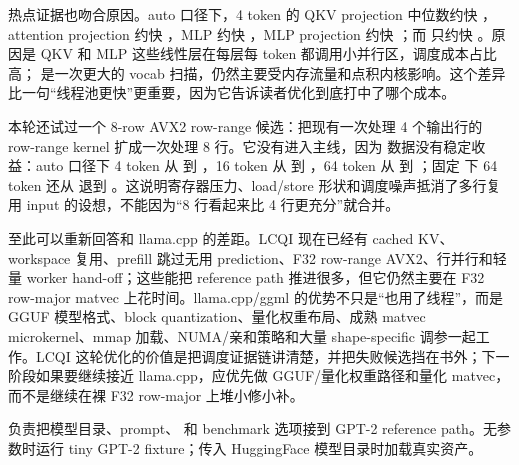热点证据也吻合原因。auto 口径下，4 token 的 QKV projection 中位数约快 ，attention projection 约快 ，MLP  约快 ，MLP projection 约快 ；而  只约快 。原因是 QKV 和 MLP 这些线性层在每层每 token 都调用小并行区，调度成本占比高； 是一次更大的 vocab 扫描，仍然主要受内存流量和点积内核影响。这个差异比一句“线程池更快”更重要，因为它告诉读者优化到底打中了哪个成本。

本轮还试过一个 8-row AVX2 row-range 候选：把现有一次处理 4 个输出行的 row-range kernel 扩成一次处理 8 行。它没有进入主线，因为  数据没有稳定收益：auto 口径下 4 token 从  到 ，16 token 从  到 ，64 token 从  到 ；固定  下 64 token 还从  退到 。这说明寄存器压力、load/store 形状和调度噪声抵消了多行复用 input 的设想，不能因为“8 行看起来比 4 行更充分”就合并。

至此可以重新回答和 llama.cpp 的差距。LCQI 现在已经有 cached KV、workspace 复用、prefill 跳过无用 prediction、F32 row-range AVX2、行并行和轻量 worker hand-off；这些能把 reference path 推进很多，但它仍然主要在 F32 row-major matvec 上花时间。llama.cpp/ggml 的优势不只是“也用了线程”，而是 GGUF 模型格式、block quantization、量化权重布局、成熟 matvec microkernel、mmap 加载、NUMA/亲和策略和大量 shape-specific 调参一起工作。LCQI 这轮优化的价值是把调度证据链讲清楚，并把失败候选挡在书外；下一阶段如果要继续接近 llama.cpp，应优先做 GGUF/量化权重路径和量化 matvec，而不是继续在裸 F32 row-major 上堆小修小补。







 负责把模型目录、prompt、 和 benchmark 选项接到 GPT-2 reference path。无参数时运行 tiny GPT-2 fixture；传入 HuggingFace 模型目录时加载真实资产。


